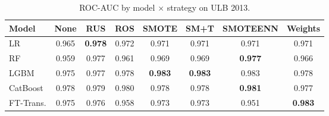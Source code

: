 \begin{table}[ht!]
\centering
\caption{ROC-AUC by model $\times$ strategy on ULB 2013.}
\label{tab:factorial_ulb_rocauc}
\begin{tabular}{l c c c c c c c}
\toprule
Model & None & RUS & ROS & SMOTE & SM+T & SMOTEENN & Weights \\
\midrule
LR         & 0.965 & \textbf{0.978} & 0.972 & 0.971 & 0.971 & 0.971 & 0.971 \\
RF         & 0.959 & 0.977 & 0.961 & 0.969 & 0.969 & \textbf{0.977} & 0.966 \\
LGBM       & 0.975 & 0.977 & 0.978 & \textbf{0.983} & \textbf{0.983} & 0.983 & 0.978 \\
CatBoost   & 0.978 & 0.979 & 0.980 & 0.978 & 0.978 & \textbf{0.981} & 0.977 \\
FT-Trans.  & 0.975 & 0.976 & 0.958 & 0.973 & 0.973 & 0.951 & \textbf{0.983} \\
\bottomrule
\end{tabular}
\end{table}